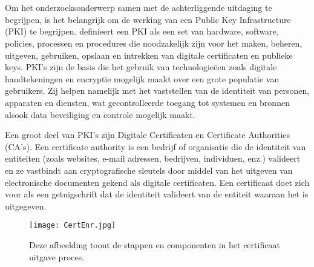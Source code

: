 \section{}%
\label{sec:Basisbegrippen}
Om het onderzoeksonderwerp samen met de achterliggende uitdaging te begrijpen, is het belangrijk om de werking van een Public Key Infrastructure (PKI) te begrijpen.
\textcite{Thales2025} definieert een PKI als een set van hardware, software, policies, processen en procedures die noodzakelijk zijn voor het maken, beheren, uitgeven, gebruiken, opslaan en intrekken van digitale certificaten en publieke keys.
PKI's zijn de basis die het gebruik van technologieëen zoals digitale handtekeningen en encryptie mogelijk maakt over een grote populatie van gebruikers.
Zij helpen namelijk met het vaststellen van de identiteit van personen, apparaten en diensten, wat gecontrolleerde toegang tot systemen en bronnen alsook data beveiliging en controle mogelijk maakt. \break

Een groot deel van PKI's zijn Digitale Certificaten en Certificate Authorities (CA's).
Een certificate authority is een bedrijf of organisatie die de identiteit van entiteiten (zoals websites, e-mail adressen, bedrijven, individuen, enz.) valideert en ze vastbindt aan cryptografische sleutels door middel van het uitgeven van electronische documenten gekend als digitale certificaten.
Een certificaat doet zich voor als een getuigschrift dat de identiteit valideert van de entiteit waaraan het is uitgegeven. \autocite{SSLcom} \break

\begin{figure}
  \centering
  \texttt{[image: CertEnr.jpg]}
  \caption[Certificate enrollment.]{\label{fig:certenr}Deze afbeelding toont de stappen en componenten in het certificaat uitgave proces.}
\end{figure}

